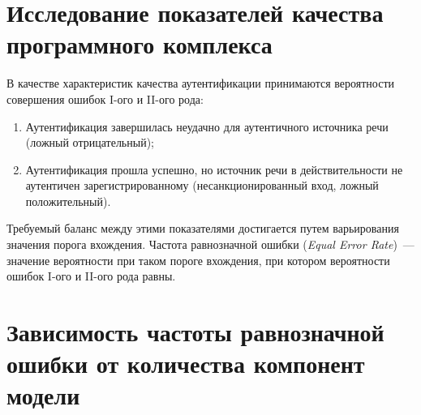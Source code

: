 \documentclass[12pt]{article}
\newcommand{\important}[1]{\emph{#1}}
\begin{document}
\section{Исследование показателей качества программного комплекса}

В качестве характеристик качества аутентификации принимаются вероятности совершения ошибок I-ого и II-ого рода:
\begin{enumerate}
\item Аутентификация завершилась неудачно для аутентичного источника речи (ложный отрицательный);
\item Аутентификация прошла успешно, но источник речи в действительности не аутентичен зарегистрированному (несанкционированный вход, ложный положительный).
\end{enumerate}

Требуемый баланс между этими показателями достигается путем варьирования значения порога вхождения.
Частота равнозначной ошибки (\important{Equal Error Rate})~--- значение вероятности при таком пороге вхождения, при котором вероятности ошибок I-ого и II-ого рода равны.

\section{Зависимость частоты равнозначной ошибки от количества компонент модели}
\begin{figure}[hp!]
\end{figure}
\end{document}
